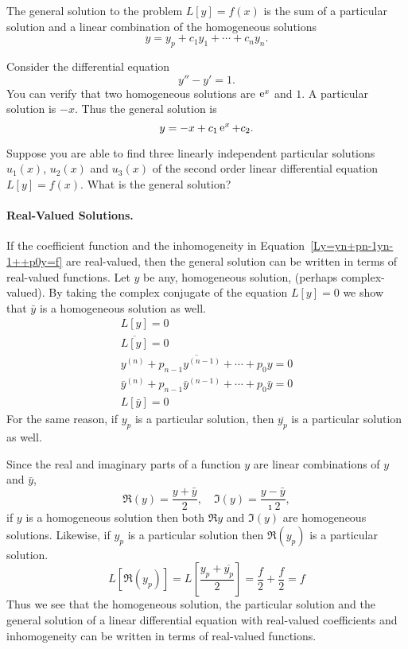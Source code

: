 The general solution to the problem $L[y] = f(x)$ is the sum of a particular solution and a 
linear combination of the homogeneous solutions
\[ y = y_p + c_1 y_1 + \cdots + c_n y_n. \]



\begin{Example}
  Consider the differential equation
  \[ 
  y'' - y' = 1. 
  \]
  You can verify that two homogeneous solutions are $\mathop{\mathrm{e}}\nolimits^x$ and $1$.  A particular
  solution is $-x$.  Thus the general solution is
  \[ 
  y = -x + c_1 \mathop{\mathrm{e}}\nolimits^x + c_2. 
  \]
\end{Example}




\begin{Exercise}
  \label{exercise 3 particular soln}
  Suppose you are able to find three linearly independent 
  particular solutions $u_1(x)$, $u_2(x)$ and $u_3(x)$ of the second order
  linear differential equation $L[y] = f(x)$.  What is the general solution?

\end{Exercise}




\paragraph{Real-Valued Solutions.}
If the coefficient function and the inhomogeneity in 
Equation~\ref{Ly=yn+pn-1yn-1++p0y=f} are real-valued, then the general 
solution can be written in terms of real-valued functions.  Let $y$ be any,
homogeneous solution, (perhaps complex-valued).  By taking the complex 
conjugate of the equation $L[y] = 0$ we show that $\bar{y}$ is a homogeneous
solution as well.
\begin{gather*}
  L[y] = 0 \\
  \overline{L[y]} = 0 \\
  \overline{y^{(n)} + p_{n-1} y^{(n-1)} + \cdots + p_0 y} = 0 \\
  \bar{y}^{(n)} + p_{n-1} \bar{y}^{(n-1)} + \cdots + p_0 \bar{y} = 0 \\
  L \left[ \bar{y} \right] = 0
\end{gather*}
For the same reason, if $y_p$ is a particular solution, then $\overline{y_p}$
is a particular solution as well.

Since the real and imaginary parts of a function $y$ are linear combinations
of $y$ and $\bar{y}$,
\[
\Re(y) = \frac{y + \bar{y}}{2}, \quad
\Im(y) = \frac{y - \bar{y}}{\imath 2},
\]
if $y$ is a homogeneous solution then both $\Re{y}$ and $\Im(y)$ are homogeneous
solutions.  Likewise, if $y_p$ is a particular solution then
$\Re(y_p)$ is a particular solution.
\[
L \left[ \Re(y_p) \right]
= L \left[ \frac{y_p + \overline{y_p}}{2} \right]
= \frac{f}{2} + \frac{f}{2}
= f
\]
Thus we see that the homogeneous solution, the particular solution and the
general solution of a linear differential equation with real-valued 
coefficients and inhomogeneity can be written in terms of real-valued
functions.



